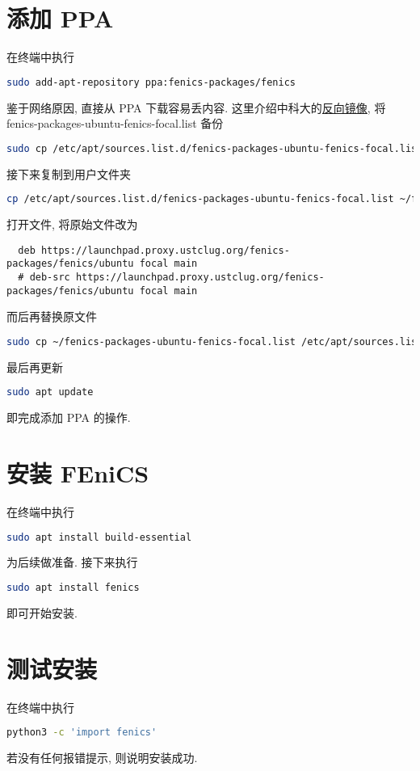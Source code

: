 \documentclass[fontset=founder]{ctexart}
\begin{document}
\section{添加 PPA}

在终端中执行
\begin{lstlisting}[language = bash]
  sudo add-apt-repository ppa:fenics-packages/fenics
\end{lstlisting}
鉴于网络原因,
直接从 PPA 下载容易丢内容.
这里介绍中科大的\href{https://lug.ustc.edu.cn/wiki/mirrors/help/revproxy/}{反向镜像},
将 \textsf{fenics-packages-ubuntu-fenics-focal.list} 备份
\begin{lstlisting}[language = bash]
  sudo cp /etc/apt/sources.list.d/fenics-packages-ubuntu-fenics-focal.list /etc/apt/sources.list.d/fenics-packages-ubuntu-fenics-focal.list.bak
\end{lstlisting}
接下来复制到用户文件夹
\begin{lstlisting}[language = bash]
  cp /etc/apt/sources.list.d/fenics-packages-ubuntu-fenics-focal.list ~/fenics-packages-ubuntu-fenics-focal.list
\end{lstlisting}
打开文件,
将原始文件改为
\begin{lstlisting}
  deb https://launchpad.proxy.ustclug.org/fenics-packages/fenics/ubuntu focal main
  # deb-src https://launchpad.proxy.ustclug.org/fenics-packages/fenics/ubuntu focal main
\end{lstlisting}
而后再替换原文件
\begin{lstlisting}[language = bash]
  sudo cp ~/fenics-packages-ubuntu-fenics-focal.list /etc/apt/sources.list.d/fenics-packages-ubuntu-fenics-focal.list
\end{lstlisting}
最后再更新
\begin{lstlisting}[language = bash]
  sudo apt update
\end{lstlisting}
即完成添加 PPA 的操作.

\section{安装 FEniCS}

在终端中执行
\begin{lstlisting}[language = bash]
  sudo apt install build-essential
\end{lstlisting}
为后续做准备.
接下来执行
\begin{lstlisting}[language = bash]
  sudo apt install fenics
\end{lstlisting}
即可开始安装.

\section{测试安装}

在终端中执行
\begin{lstlisting}[language = bash]
  python3 -c 'import fenics'
\end{lstlisting}
若没有任何报错提示,
则说明安装成功.
\end{document}
